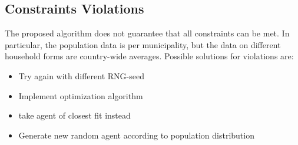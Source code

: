 \documentclass[]{scrartcl}
\begin{document}
	\subsection{Constraints Violations}
	The proposed algorithm does not guarantee that all constraints can be met. In particular, the population data is per municipality, but the data on different household forms are country-wide averages. Possible solutions for violations are:
	\begin{itemize}
		\item Try again with different RNG-seed
		\item Implement optimization algorithm
		\item take agent of closest fit instead
		\item Generate new random agent according to population distribution 
	\end{itemize}
\end{document}
